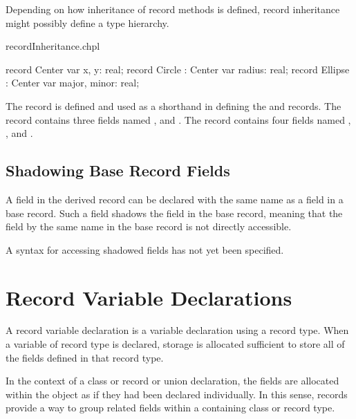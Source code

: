 \begin{future}
Depending on how inheritance of record methods is defined, record
inheritance might possibly define a type hierarchy.
\end{future}


\begin{chapelexample}{recordInheritance.chpl}
\begin{chapel}
record Center { var x, y: real; }
record Circle : Center {
  var radius: real;
}
record Ellipse : Center {
  var major, minor: real;
}
\end{chapel}
\begin{chapeloutput}
\end{chapeloutput}
The record  is defined and used as a shorthand in defining
the  and  records.  The  record contains
three  fields named ,  and .  The
 record contains four  fields named , ,
 and .
\end{chapelexample}

\subsection{Shadowing Base Record Fields}
\label{Shadowing_Base_Record_Fields}

A field in the derived record can be declared with the same name as a
field in a base record.  Such a field shadows the field in the base
record, meaning that the field by the same name in the base record is not
directly accessible.

\begin{openissue}
A syntax for accessing shadowed fields has not yet been specified.
\end{openissue}

\section{Record Variable Declarations}
\label{Record_Variable_Declarations}

A record variable declaration is a variable declaration using a record type.
When a variable of record type is declared, storage is allocated sufficient to
store all of the fields defined in that record type.  

In the context of a class or record or union declaration, the fields are
allocated within the object as if they had been declared individually.  In this
sense, records provide a way to group related fields within a containing class
or record type. 

